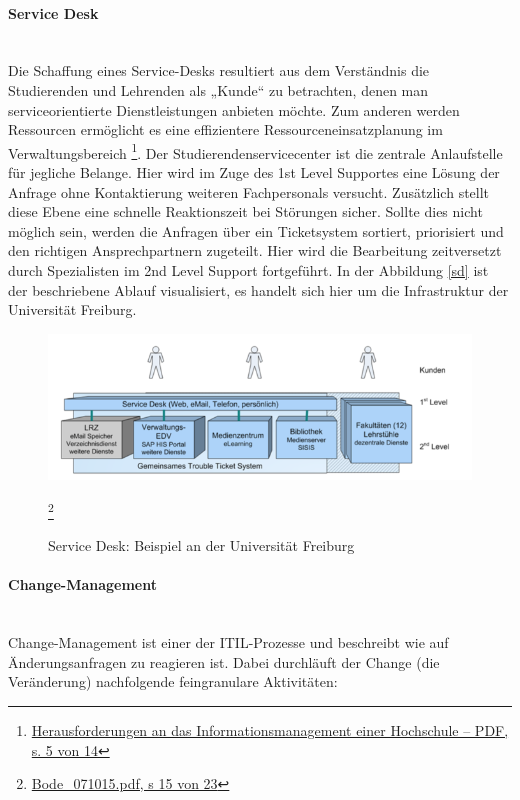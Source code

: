 \documentclass[a4paper, 12pt]{scrreprt}
\begin{document}
\paragraph{Service Desk}\mbox{}\\	
Die Schaffung eines Service-Desks resultiert aus dem Verständnis die Studierenden und Lehrenden als „Kunde“ zu betrachten, denen man serviceorientierte Dienstleistungen anbieten möchte. Zum anderen werden Ressourcen ermöglicht es eine effizientere Ressourceneinsatzplanung im Verwaltungsbereich \footnote{\url{Herausforderungen an das Informationsmanagement einer Hochschule – PDF, s. 5 von 14}}. Der Studierendenservicecenter ist die zentrale Anlaufstelle für jegliche Belange. Hier wird im Zuge des 1st Level Supportes eine Lösung der Anfrage ohne Kontaktierung weiteren Fachpersonals versucht. Zusätzlich stellt diese Ebene eine schnelle Reaktionszeit bei Störungen sicher. Sollte dies nicht möglich sein, werden die Anfragen über ein Ticketsystem sortiert, priorisiert und den richtigen Ansprechpartnern zugeteilt. Hier wird die Bearbeitung zeitversetzt durch Spezialisten im 2nd Level Support fortgeführt. In der Abbildung \ref{sd} ist der beschriebene Ablauf visualisiert, es handelt sich hier um die Infrastruktur der Universität Freiburg.
 
\begin{figure}[h!]
	\centering
	\includegraphics[width=15cm]{bilder_olli/ServiceDesk}
	\caption{Service Desk: Beispiel an der Universität Freiburg}  \footnote{\url{Bode_071015.pdf, s 15 von 23}}
	\label{SD}
\end{figure}

 

\paragraph{Change-Management}\mbox{}\\
Change-Management ist einer der ITIL-Prozesse und beschreibt wie auf Änderungsanfragen zu reagieren ist. Dabei durchläuft der Change (die Veränderung) nachfolgende feingranulare Aktivitäten:
\end{document}
